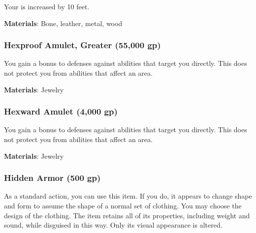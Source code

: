 Your  is increased by 10 feet.



\vspace{0.25em}
\textbf{Materials}: Bone, leather, metal, wood


\lowercase{\hypertarget{item:Hexproof Amulet, Greater}{}}\label{item:Hexproof Amulet, Greater}
\hypertarget{item:Hexproof Amulet, Greater}{\subsubsection{Hexproof Amulet, Greater\hfill{} (55,000 gp)}}

You gain a  bonus to defenses against  abilities that target you directly.
This does not protect you from abilities that affect an area.



\vspace{0.25em}
\textbf{Materials}: Jewelry


\lowercase{\hypertarget{item:Hexward Amulet}{}}\label{item:Hexward Amulet}
\hypertarget{item:Hexward Amulet}{\subsubsection{Hexward Amulet\hfill{} (4,000 gp)}}

You gain a  bonus to defenses against  abilities that target you directly.
This does not protect you from abilities that affect an area.



\vspace{0.25em}
\textbf{Materials}: Jewelry


\lowercase{\hypertarget{item:Hidden Armor}{}}\label{item:Hidden Armor}
\hypertarget{item:Hidden Armor}{\subsubsection{Hidden Armor\hfill{} (500 gp)}}

As a standard action, you can use this item.
If you do, it appears to change shape and form to assume the shape of a normal set of clothing.
You may choose the design of the clothing.
The item retains all of its properties, including weight and sound, while disguised in this way.
Only its visual appearance is altered.


